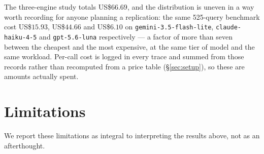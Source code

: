 \documentclass[11pt,a4paper]{article}
\begin{document}
The three-engine study totals US\$$66.69$, and the distribution is uneven in
a way worth recording for anyone planning a replication: the same 525-query
benchmark cost US\$$15.93$, US\$$44.66$ and US\$$6.10$ on
\texttt{gemini-3.5-flash-lite}, \texttt{claude-haiku-4-5} and
\texttt{gpt-5.6-luna} respectively --- a factor of more than seven between
the cheapest and the most expensive, at the same tier of model and the same
workload. Per-call cost is logged in every trace and summed from those
records rather than recomputed from a price table (\S\ref{sec:setup}), so
these are amounts actually spent.

\section{Limitations}
\label{sec:limitations}

We report these limitations as integral to interpreting the results above,
not as an afterthought.
\end{document}
